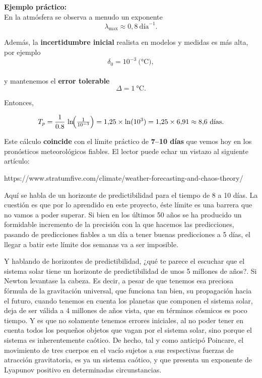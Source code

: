 \documentclass[
  10pt,
  a4paper,
  DIV=11,
  numbers=noendperiod,
  open=any]{scrreprt}
\numberwithin{equation}{chapter}
\numberwithin{equation}{section}
\renewcommand{\[}{\begin{equation}}
\renewcommand{\]}{\end{equation}}
\begin{document}
\textbf{Ejemplo práctico:}\\
En la atmósfera se observa a menudo un exponente\\
\[
\lambda_{\max} \approx 0{,}8\ \text{día}^{-1}.
\]

Además, la \textbf{incertidumbre inicial} realista en modelos y medidas
es más alta, por ejemplo\\
\[
\delta_0 = 10^{-3}\ \text{(°C)},
\]\\
y mantenemos el \textbf{error tolerable}\\
\[
\Delta = 1\ \text{°C}.
\]

Entonces,

\begin{equation}
T_p
= \frac{1}{0.8}\,\ln\!\Bigl(\tfrac{1}{10^{-3}}\Bigr)
=1{,}25 \times \ln(10^3)
=1{,}25 \times 6{,}91
\approx 8{,}6\ \text{días}.
\end{equation}

Este cálculo \textbf{coincide} con el límite práctico de \textbf{7--10
días} que vemos hoy en los pronósticos meteorológicos fiables. El lector
puede echar un vistazo al siguiente artículo:

https://www.stratumfive.com/climate/weather-forecasting-and-chaos-theory/

Aquí se habla de un horizonte de predictibilidad para el tiempo de 8 a
10 días. La cuestión es que por lo aprendido en este proyecto, éste
límite es una barrera que no vamos a poder superar. Si bien en los
últimos 50 años se ha producido un formidable incremento de la precisión
con la que hacemos las predicciones, pasando de predicciones fiables a
un día a tener buenas predicciones a 5 días, el llegar a batir este
límite dos semanas va a ser imposible.

Y hablando de horizontes de predictibilidad, ¿qué te parece el escuchar
que el sistema solar tiene un horizonte de predictibilidad de unos 5
millones de años?. Si Newton levantase la cabeza. Es decir, a pesar de
que tenemos esa preciosa fórmula de la gravitación universal, que
funciona tan bien, su propagación hacia el futuro, cuando tenemos en
cuenta los planetas que componen el sistema solar, deja de ser válida a
4 millones de años vista, que en términos cósmicos es poco tiempo. Y es
que no solamente tenemos errores iniciales, al no poder tener en cuenta
todos los pequeños objetos que vagan por el sistema solar, sino porque
el sistema es inherentemente caótico. De hecho, tal y como anticipó
Poincare, el movimiento de tres cuerpos en el vacío sujetos a sus
respectivas fuerzas de atracción gravitatoria, es ya un sistema caótico,
y que presenta un exponente de Lyapunov positivo en determinadas
circunstancias.
\end{document}
